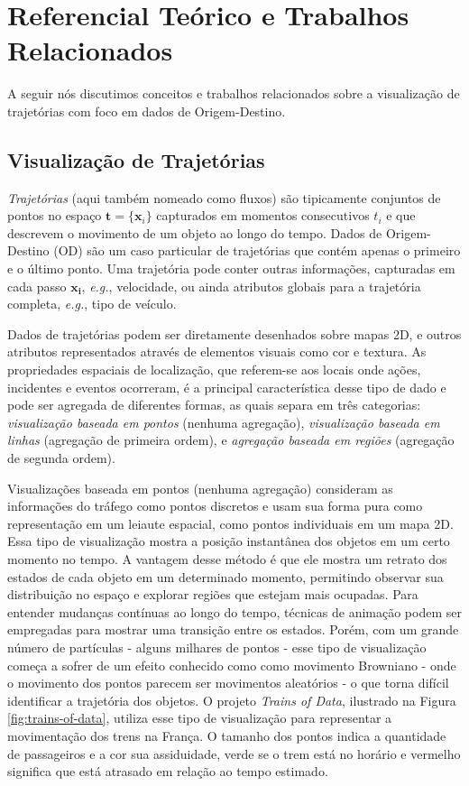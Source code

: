 
\chapter{Referencial Teórico e Trabalhos Relacionados}
\label{cap:referencial-teorico}

  A seguir nós discutimos conceitos e trabalhos relacionados sobre a visualização de
trajetórias com foco em dados de Origem-Destino.

\section{Visualização de Trajetórias}
\label{sec:dados-de-trajetorias}

\emph{Trajetórias} (aqui também nomeado como fluxos) são tipicamente conjuntos
de pontos no espaço $\mathbf{t} = \{\mathbf{x}_i\}$ capturados em momentos
consecutivos $t_i$ e que descrevem o movimento de um objeto ao longo do tempo.
Dados de Origem-Destino (OD) são um caso particular de trajetórias que contém
apenas o primeiro e o último ponto. Uma trajetória pode conter outras
informações, capturadas em cada passo $\mathbf{x_i}$, \emph{e.g.}, velocidade,
ou ainda atributos globais para a trajetória completa, \emph{e.g.}, tipo de
veículo.

Dados de trajetórias podem ser diretamente desenhados sobre mapas 2D,
e outros atributos representados através de elementos visuais como cor e textura.
As propriedades espaciais de localização, que referem-se
aos locais onde ações, incidentes e eventos ocorreram, é a principal característica
desse tipo de dado e pode ser agregada de diferentes formas, as quais \citet{Chen2015}
separa em três categorias: \emph{visualização baseada  em pontos} (nenhuma agregação), \emph{visualização baseada em linhas}
(agregação de primeira ordem), e \emph{agregação baseada em regiões} (agregação de segunda ordem).


Visualizações baseada em pontos (nenhuma agregação)
consideram as informações do tráfego como pontos discretos e usam sua forma
pura como representação em um leiaute espacial, como pontos individuais em um mapa 2D.
Essa tipo de visualização mostra a posição instantânea dos objetos em um certo momento
no tempo. A vantagem desse método é que ele mostra um retrato dos estados de cada objeto em um
determinado momento, permitindo observar sua distribuição no espaço e explorar regiões que estejam
mais ocupadas. Para entender mudanças contínuas ao longo do tempo, técnicas de animação podem
ser empregadas para mostrar uma transição entre os estados. Porém, com um grande número de partículas
- alguns milhares de pontos - esse tipo de visualização começa a sofrer
de um efeito conhecido como como movimento Browniano - onde o movimento dos pontos parecem ser movimentos
aleatórios - o que torna difícil identificar a trajetória dos objetos. O projeto \emph{Trains of Data},
ilustrado na Figura \ref{fig:trains-of-data}, utiliza esse tipo de visualização para
representar a movimentação dos trens na França. O tamanho dos pontos indica a quantidade de passageiros e a cor
sua assiduidade, verde se o trem está no horário e vermelho significa que está atrasado
em relação ao tempo estimado.

